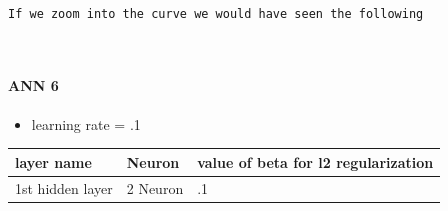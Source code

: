 \documentclass[11pt, a4paper , landscape]{article}
\providecommand{\tightlist}{%
      \setlength{\itemsep}{0pt}\setlength{\parskip}{0pt}}
\begin{document}
    \begin{center}
    \end{center}
    { \hspace*{\fill} \\}
    
    \begin{Verbatim}[commandchars=\\\{\}]
If we zoom into the curve we would have seen the following

    \end{Verbatim}

    \begin{center}
    \end{center}
    { \hspace*{\fill} \\}
    
    \paragraph{ANN 6}\label{ann-6}

\begin{itemize}
\tightlist
\item
  learning rate = .1
\end{itemize}

\begin{longtable}[]{@{}lll@{}}
\toprule
layer name & Neuron & value of beta for l2 regularization\tabularnewline
\midrule
\endhead
1st hidden layer & 2 Neuron & .1\tabularnewline
\bottomrule
\end{longtable}
\end{document}
